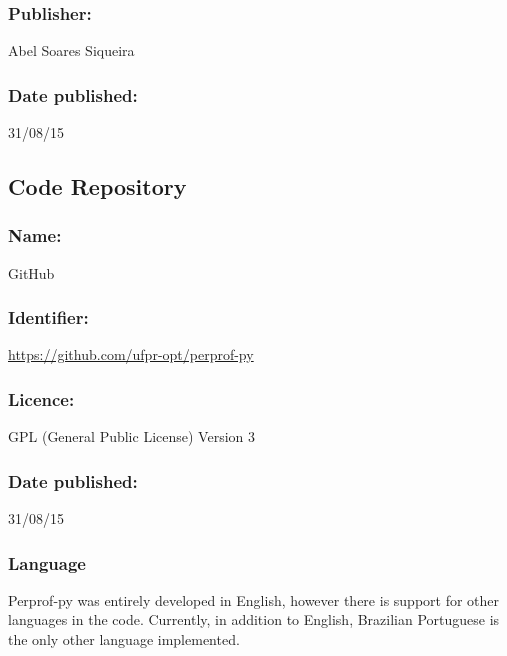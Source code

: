     \subsubsection*{Publisher:} Abel Soares Siqueira

    \subsubsection*{Date published:} 31/08/15

\subsection*{Code Repository}

    \subsubsection*{Name:} GitHub

    \subsubsection*{Identifier:} \url{https://github.com/ufpr-opt/perprof-py}

    \subsubsection*{Licence:} GPL (General Public License) Version 3

    \subsubsection*{Date published:} 31/08/15

\subsubsection*{Language}

    Perprof-py was entirely developed in English, however there is support for
    other languages in the code. Currently,  in addition to English,  Brazilian Portuguese is the only other language implemented.

